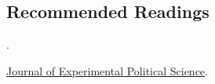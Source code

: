 \documentclass[letterpaper]{article}
\renewenvironment{itemize}{
  \begin{list}{}{
    \setlength{\leftmargin}{1.5em}
  }
}{
  \end{list}
}
\begin{document}
\subsection*{Recommended Readings}

\begin{itemize} 



        \item[$\diamond$] \href{https://doi-org.ezproxy.utu.fi/10.1017/CBO9780511762888}{}.


        \item[$\diamond$] \href{https://www.cambridge.org/core/journals/journal-of-experimental-political-science}{Journal of Experimental Political Science}.


        











\end{itemize} 
\end{document}
